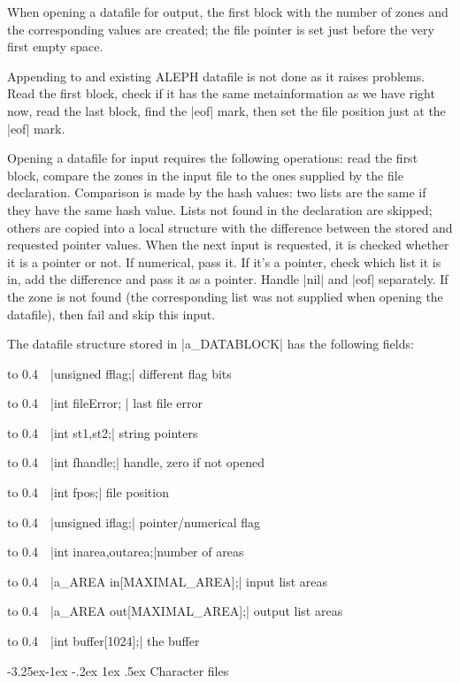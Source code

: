 \documentclass{article}
\makeatletter
\newcommand\A{{\sf ALEPH}}
\renewcommand\subsection{%
\@startsection{subsection}{2}{\z@}%
   {-3.25ex\@plus -1ex \@minus -.2ex}%
   {1ex \@plus .5ex}%
   {\normalfont\normalsize\bfseries}}
\makeatother
\begin{document}
When opening a datafile for output, the first block with the number of zones
and the corresponding values are created; the file pointer is set just
before the very first empty space.

Appending to and existing \A{} datafile is not done as it raises problems. 
Read the first block, check if it has the same metainformation as we have
right now, read the last block, find the \pp|eof| mark, then set the file
position just at the \pp|eof| mark.

Opening a datafile for input requires the following operations: read the 
first block, compare the zones
in the input file to the ones supplied by the file declaration. Comparison is
made by the hash values: two lists are the same if they have the same hash
value. Lists not found in the declaration are skipped; others are copied into a
local structure with the difference between the stored and requested pointer
values. When the next input is requested, it is checked whether it is a
pointer or not. If numerical, pass it. If it's a pointer, check which list
it is in, add the difference and pass it as a pointer. Handle \pp|nil|
and \pp|eof| separately. If the zone is not found (the corresponding list
was not supplied when opening the datafile), then fail and skip this input. 

The datafile structure stored in \pp|a\_DATABLOCK| has the following fields:

\medskip

\def\HH{\noindent\hbox to 0.4\linewidth\bgroup~~}%

\HH\pp|unsigned fflag;| \HE different flag bits

\HH\pp|int      fileError; | \HE last file error

\HH\pp|int      st1,st2;|    \HE string pointers

\HH\pp|int      fhandle;|    \HE handle, zero if not opened

\HH\pp|int      fpos;|       \HE file position

\HH\pp|unsigned iflag;| \HE pointer/numerical flag

\HH\pp|int inarea,outarea;|\HE number of areas

\HH\pp|a\_AREA  in[MAXIMAL\_AREA];| \HE input list areas

\HH\pp|a\_AREA out[MAXIMAL\_AREA];| \HE output list areas

\HH\pp|int      buffer[1024];| \HE the buffer


\subsection{Character files}\label{subsec:charfile}
\end{document}
